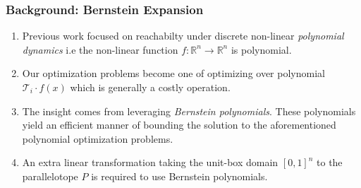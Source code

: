 \documentclass{beamer}
\begin{document}
\begin{frame}
  \frametitle{\textbf{Background:} Bernstein Expansion}
  \begin{enumerate}
    \item Previous work focused on reachabilty under discrete non-linear \emph{polynomial dynamics} i.e the non-linear function $f: \mathbb{R}^n \rightarrow \mathbb{R}^n$ is polynomial.
    \item Our optimization problems become one of optimizing over polynomial $\mathcal{T}_i\cdot f(x)$ which is generally a costly operation.
    \item The insight comes from leveraging \emph{Bernstein polynomials}. These polynomials yield an efficient manner of bounding the solution to the aforementioned polynomial optimization problems.
    \item An extra linear transformation taking the unit-box domain $[0,1]^n$ to the parallelotope $P$ is required to use Bernstein polynomials.

  \end{enumerate}
\end{frame}
\end{document}
